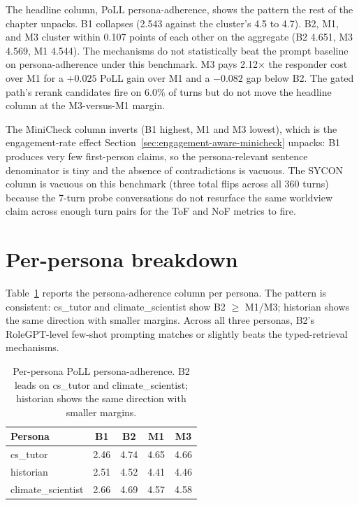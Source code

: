 The headline column, PoLL persona-adherence, shows the pattern the rest of the chapter unpacks. B1 collapses (2.543 against the cluster's 4.5 to 4.7). B2, M1, and M3 cluster within 0.107 points of each other on the aggregate (B2 4.651, M3 4.569, M1 4.544). The mechanisms do not statistically beat the prompt baseline on persona-adherence under this benchmark. M3 pays 2.12$\times$ the responder cost over M1 for a $+0.025$ PoLL gain over M1 and a $-0.082$ gap below B2. The gated path's rerank candidates fire on 6.0\% of turns but do not move the headline column at the M3-versus-M1 margin.

The MiniCheck column inverts (B1 highest, M1 and M3 lowest), which is the engagement-rate effect Section~\ref{sec:engagement-aware-minicheck} unpacks: B1 produces very few first-person claims, so the persona-relevant sentence denominator is tiny and the absence of contradictions is vacuous. The SYCON column is vacuous on this benchmark (three total flips across all 360 turns) because the 7-turn probe conversations do not resurface the same worldview claim across enough turn pairs for the ToF and NoF metrics to fire.

\section{Per-persona breakdown}
\label{sec:per-persona}

Table~\ref{tab:per-persona-poll} reports the persona-adherence column per persona. The pattern is consistent: cs\_tutor and climate\_scientist show B2 $\geq$ M1/M3; historian shows the same direction with smaller margins. Across all three personas, B2's RoleGPT-level few-shot prompting matches or slightly beats the typed-retrieval mechanisms.

\begin{table}[H]
  \centering
  \small
  \caption{Per-persona PoLL persona-adherence. B2 leads on cs\_tutor and climate\_scientist; historian shows the same direction with smaller margins.}
  \label{tab:per-persona-poll}
  \begin{tabular}{lcccc}
    \toprule
    \textbf{Persona} & \textbf{B1} & \textbf{B2} & \textbf{M1} & \textbf{M3} \\
    \midrule
    cs\_tutor          & 2.46 & 4.74 & 4.65 & 4.66 \\
    historian          & 2.51 & 4.52 & 4.41 & 4.46 \\
    climate\_scientist & 2.66 & 4.69 & 4.57 & 4.58 \\
    \bottomrule
  \end{tabular}
\end{table}


